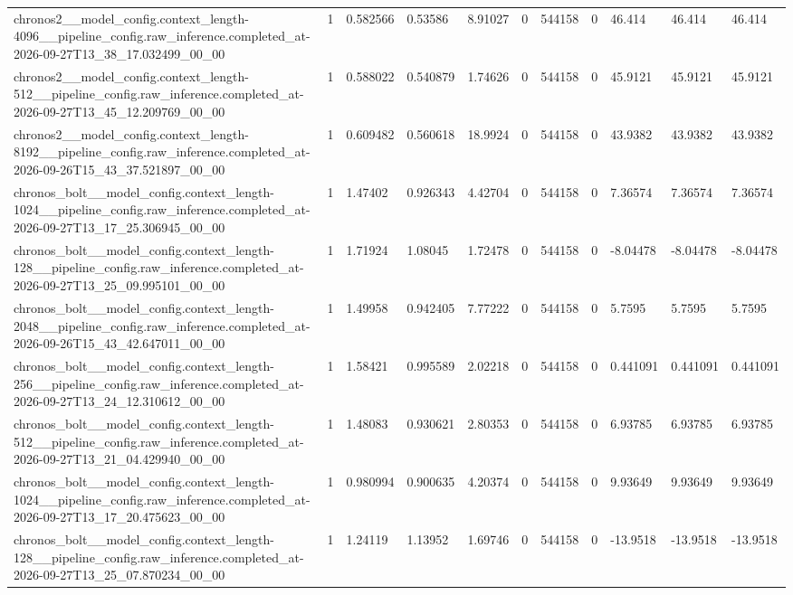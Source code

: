 \begin{tabular}{lllllllllll}
chronos2\_\_model\_config.context\_length-4096\_\_pipeline\_config.raw\_inference.completed\_at-2026-09-27T13\_38\_17.032499\_00\_00 & 1 & 0.582566 & 0.53586 & 8.91027 & 0 & 544158 & 0 & 46.414 & 46.414 & 46.414 \\
chronos2\_\_model\_config.context\_length-512\_\_pipeline\_config.raw\_inference.completed\_at-2026-09-27T13\_45\_12.209769\_00\_00 & 1 & 0.588022 & 0.540879 & 1.74626 & 0 & 544158 & 0 & 45.9121 & 45.9121 & 45.9121 \\
chronos2\_\_model\_config.context\_length-8192\_\_pipeline\_config.raw\_inference.completed\_at-2026-09-26T15\_43\_37.521897\_00\_00 & 1 & 0.609482 & 0.560618 & 18.9924 & 0 & 544158 & 0 & 43.9382 & 43.9382 & 43.9382 \\
chronos\_bolt\_\_model\_config.context\_length-1024\_\_pipeline\_config.raw\_inference.completed\_at-2026-09-27T13\_17\_25.306945\_00\_00 & 1 & 1.47402 & 0.926343 & 4.42704 & 0 & 544158 & 0 & 7.36574 & 7.36574 & 7.36574 \\
chronos\_bolt\_\_model\_config.context\_length-128\_\_pipeline\_config.raw\_inference.completed\_at-2026-09-27T13\_25\_09.995101\_00\_00 & 1 & 1.71924 & 1.08045 & 1.72478 & 0 & 544158 & 0 & -8.04478 & -8.04478 & -8.04478 \\
chronos\_bolt\_\_model\_config.context\_length-2048\_\_pipeline\_config.raw\_inference.completed\_at-2026-09-26T15\_43\_42.647011\_00\_00 & 1 & 1.49958 & 0.942405 & 7.77222 & 0 & 544158 & 0 & 5.7595 & 5.7595 & 5.7595 \\
chronos\_bolt\_\_model\_config.context\_length-256\_\_pipeline\_config.raw\_inference.completed\_at-2026-09-27T13\_24\_12.310612\_00\_00 & 1 & 1.58421 & 0.995589 & 2.02218 & 0 & 544158 & 0 & 0.441091 & 0.441091 & 0.441091 \\
chronos\_bolt\_\_model\_config.context\_length-512\_\_pipeline\_config.raw\_inference.completed\_at-2026-09-27T13\_21\_04.429940\_00\_00 & 1 & 1.48083 & 0.930621 & 2.80353 & 0 & 544158 & 0 & 6.93785 & 6.93785 & 6.93785 \\
chronos\_bolt\_\_model\_config.context\_length-1024\_\_pipeline\_config.raw\_inference.completed\_at-2026-09-27T13\_17\_20.475623\_00\_00 & 1 & 0.980994 & 0.900635 & 4.20374 & 0 & 544158 & 0 & 9.93649 & 9.93649 & 9.93649 \\
chronos\_bolt\_\_model\_config.context\_length-128\_\_pipeline\_config.raw\_inference.completed\_at-2026-09-27T13\_25\_07.870234\_00\_00 & 1 & 1.24119 & 1.13952 & 1.69746 & 0 & 544158 & 0 & -13.9518 & -13.9518 & -13.9518 \\

\end{tabular}
